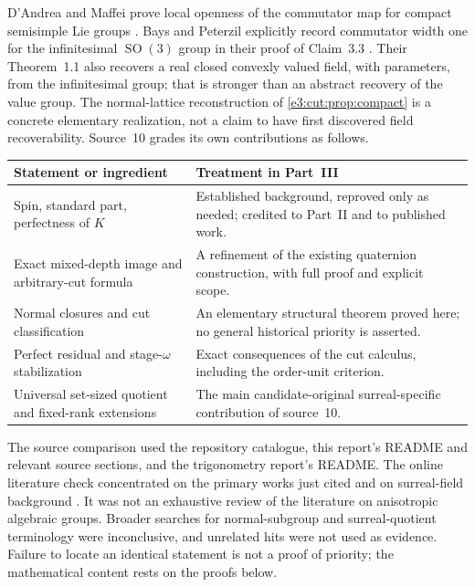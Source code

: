 \documentclass[11pt,letterpaper]{article}
\numberwithin{equation}{section}
\theoremstyle{definition}
\theoremstyle{remark}
\newcommand{\SO}{\operatorname{SO}}
\begin{document}
D'Andrea and Maffei prove local openness of the commutator map for compact
semisimple Lie groups \cite[Theorem~2.5]{DM}. Bays and Peterzil explicitly
record commutator width one for the infinitesimal $\SO(3)$ group in their proof
of Claim~3.3 \cite{BP}. Their Theorem~1.1 also recovers a real closed convexly
valued field, with parameters, from the infinitesimal group; that is stronger
than an abstract recovery of the value group. The normal-lattice
reconstruction of \cref{e3:cut:prop:compact} is a concrete elementary
realization, not a claim to have first discovered field recoverability.
Source~10 grades its own contributions as follows.

\begin{center}\small
\begin{tabular}{L{0.3\textwidth}L{0.6\textwidth}}
\toprule
Statement or ingredient & Treatment in Part~III\\
\midrule
Spin, standard part, perfectness of $K$ & Established background, reproved
only as needed; credited to Part~II and to published work.\\
Exact mixed-depth image and arbitrary-cut formula & A refinement of the
existing quaternion construction, with full proof and explicit scope.\\
Normal closures and cut classification & An elementary structural theorem
proved here; no general historical priority is asserted.\\
Perfect residual and stage-$\omega$ stabilization & Exact consequences of the
cut calculus, including the order-unit criterion.\\
Universal set-sized quotient and fixed-rank extensions & The main
candidate-original surreal-specific contribution of source~10.\\
\bottomrule
\end{tabular}
\end{center}

The source comparison used the repository catalogue, this report's README and
relevant source sections, and the trigonometry report's README. The online
literature check concentrated on the primary works just cited and on
surreal-field background \cite{BG}. It was not an exhaustive review of the
literature on anisotropic algebraic groups. Broader searches for
normal-subgroup and surreal-quotient terminology were inconclusive, and
unrelated hits were not used as evidence. Failure to locate an identical
statement is not a proof of priority; the mathematical content rests on the
proofs below.
\end{document}
